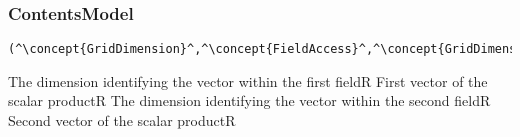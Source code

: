 \subsubsection*{ContentsModel}{}

\begin{lstlisting}[style=default,frame=none]
(^\concept{GridDimension}^,^\concept{FieldAccess}^,^\concept{GridDimension}^,^\concept{FieldAccess}^)
\end{lstlisting}

\begin{HIRChildElements} 
	{The dimension identifying the vector within the first field}{R}
	{First vector of the scalar product}{R}
	{The dimension identifying the vector within the second field}{R}
	{Second vector of the scalar product}{R}
\end{HIRChildElements}

